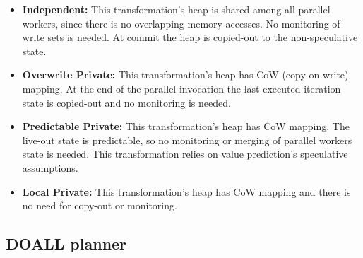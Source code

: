 
\begin{itemize}
%
\item \textbf{Independent:} This transformation's heap is shared
  among all parallel workers, since there is no overlapping memory
  accesses.
  No monitoring of write sets is needed. At commit the heap is copied-out
  to the non-speculative state.
%


\item \textbf{Overwrite Private:} This transformation's heap has
  CoW (copy-on-write) mapping. At the end of the parallel
  invocation the last executed iteration
  state is copied-out and no monitoring is needed.

%

\item \textbf{Predictable Private:} This transformation's heap
  has CoW mapping. The live-out state is predictable, so no monitoring
  or merging of parallel workers state is needed. This transformation
  relies on value prediction's speculative assumptions.

\item \textbf{Local Private:} This transformation's heap has
  CoW mapping and there is no need for copy-out or monitoring.

\end{itemize}

%

\subsection{DOALL planner}
\label{planner}


